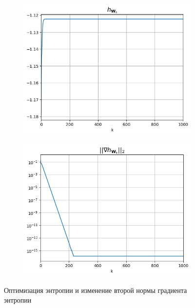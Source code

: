 \documentclass[a4paper,12pt]{article}
\begin{document}
	
	\begin{figure}[h!]
		\centering
		\begin{subfigure}{0.3\linewidth}
			\includegraphics[width=\linewidth]{plots/h1}
		\end{subfigure}
		\begin{subfigure}{0.3\linewidth}
			\includegraphics[width=\linewidth]{plots/grad1}
		\end{subfigure}
		\caption{Оптимизация энтропии и изменение второй нормы градиента энтропии}
	\end{figure}
	
\end{document}
